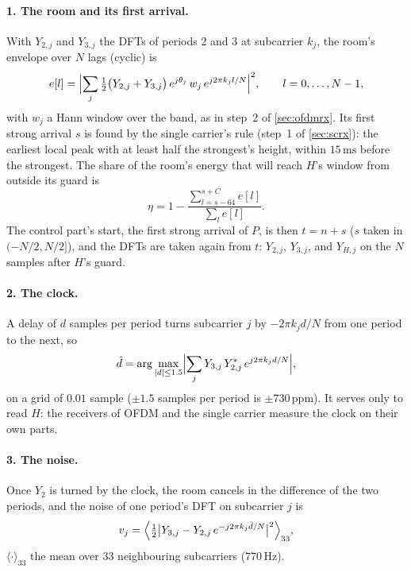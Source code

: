 \documentclass[11pt,a4paper]{article}
\newcommand{\Hz}{\,\mathrm{Hz}}
\newcommand{\ms}{\,\mathrm{ms}}
\theoremstyle{remark}
\begin{document}
\paragraph{1. The room and its first arrival.}
With $Y_{2,j}$ and $Y_{3,j}$ the DFTs of periods 2 and 3 at subcarrier $k_j$, the room's envelope over $N$ lags (cyclic) is
\begin{equation}
e[l] = \Bigl|\sum_j \tfrac12 \bigl(Y_{2,j} + Y_{3,j}\bigr)\, e^{j\theta_j}\, w_j\, e^{j 2\pi k_j l/N}\Bigr|^2, \qquad l = 0, \dots, N - 1,
\end{equation}
with $w_j$ a Hann window over the band, as in step~2 of \cref{sec:ofdmrx}. Its first strong arrival $s$ is found by the single carrier's rule (step~1 of \cref{sec:scrx}): the earliest local peak with at least half the strongest's height, within $15\ms$ before the strongest. The share of the room's energy that will reach $H$'s window from outside its guard is
\begin{equation}
\eta = 1 - \frac{\sum_{l = s - 64}^{s + C} e[l]}{\sum_l e[l]}.
\end{equation}
The control part's start, the first strong arrival of $P$, is then $t = n + s$ ($s$ taken in $(-N/2, N/2]$), and the DFTs are taken again from $t$: $Y_{2,j}$, $Y_{3,j}$, and $Y_{H,j}$ on the $N$ samples after $H$'s guard.

\paragraph{2. The clock.}
A delay of $d$ samples per period turns subcarrier $j$ by $-2\pi k_j d/N$ from one period to the next, so
\begin{equation}
\hat d = \arg\max_{|d| \le 1.5} \Bigl|\sum_j Y_{3,j}\, Y_{2,j}^*\, e^{j 2\pi k_j d/N}\Bigr|,
\end{equation}
on a grid of $0.01$ sample ($\pm 1.5$ samples per period is $\pm 730$\,ppm). It serves only to read $H$: the receivers of OFDM and the single carrier measure the clock on their own parts.

\paragraph{3. The noise.}
Once $Y_2$ is turned by the clock, the room cancels in the difference of the two periods, and the noise of one period's DFT on subcarrier $j$ is
\begin{equation}
v_j = \Bigl\langle \tfrac12 \bigl|Y_{3,j} - Y_{2,j}\, e^{-j 2\pi k_j \hat d/N}\bigr|^2 \Bigr\rangle_{33},
\end{equation}
$\langle\cdot\rangle_{33}$ the mean over 33 neighbouring subcarriers ($770\Hz$).
\end{document}
